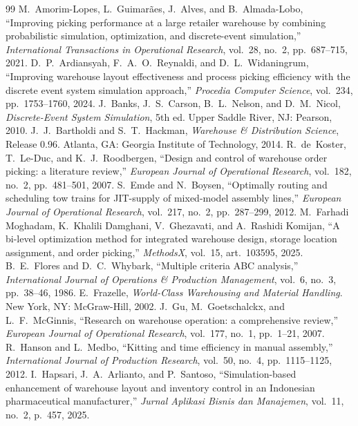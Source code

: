 \documentclass[conference]{IEEEtran}
\begin{document}
\begin{thebibliography}{99}
 M.~Amorim-Lopes, L.~Guimar\~aes, J.~Alves, and B.~Almada-Lobo, ``Improving picking performance at a large retailer warehouse by combining probabilistic simulation, optimization, and discrete-event simulation,'' \textit{International Transactions in Operational Research}, vol.~28, no.~2, pp.~687--715, 2021.
 D.~P.~Ardiansyah, F.~A.~O.~Reynaldi, and D.~L.~Widaningrum, ``Improving warehouse layout effectiveness and process picking efficiency with the discrete event system simulation approach,'' \textit{Procedia Computer Science}, vol.~234, pp.~1753--1760, 2024.
 J.~Banks, J.~S.~Carson, B.~L.~Nelson, and D.~M.~Nicol, \textit{Discrete-Event System Simulation}, 5th ed. Upper Saddle River, NJ: Pearson, 2010.
 J.~J.~Bartholdi and S.~T.~Hackman, \textit{Warehouse \& Distribution Science}, Release 0.96. Atlanta, GA: Georgia Institute of Technology, 2014.
 R.~de~Koster, T.~Le-Duc, and K.~J.~Roodbergen, ``Design and control of warehouse order picking: a literature review,'' \textit{European Journal of Operational Research}, vol.~182, no.~2, pp.~481--501, 2007.
 S.~Emde and N.~Boysen, ``Optimally routing and scheduling tow trains for JIT-supply of mixed-model assembly lines,'' \textit{European Journal of Operational Research}, vol.~217, no.~2, pp.~287--299, 2012.
 M.~Farhadi Moghadam, K.~Khalili Damghani, V.~Ghezavati, and A.~Rashidi Komijan, ``A bi-level optimization method for integrated warehouse design, storage location assignment, and order picking,'' \textit{MethodsX}, vol.~15, art.~103595, 2025.
 B.~E.~Flores and D.~C.~Whybark, ``Multiple criteria ABC analysis,'' \textit{International Journal of Operations \& Production Management}, vol.~6, no.~3, pp.~38--46, 1986.
 E.~Frazelle, \textit{World-Class Warehousing and Material Handling}. New York, NY: McGraw-Hill, 2002.
 J.~Gu, M.~Goetschalckx, and L.~F.~McGinnis, ``Research on warehouse operation: a comprehensive review,'' \textit{European Journal of Operational Research}, vol.~177, no.~1, pp.~1--21, 2007.
 R.~Hanson and L.~Medbo, ``Kitting and time efficiency in manual assembly,'' \textit{International Journal of Production Research}, vol.~50, no.~4, pp.~1115--1125, 2012.
 I.~Hapsari, J.~A.~Arlianto, and P.~Santoso, ``Simulation-based enhancement of warehouse layout and inventory control in an Indonesian pharmaceutical manufacturer,'' \textit{Jurnal Aplikasi Bisnis dan Manajemen}, vol.~11, no.~2, p.~457, 2025.

\end{thebibliography}
\end{document}

